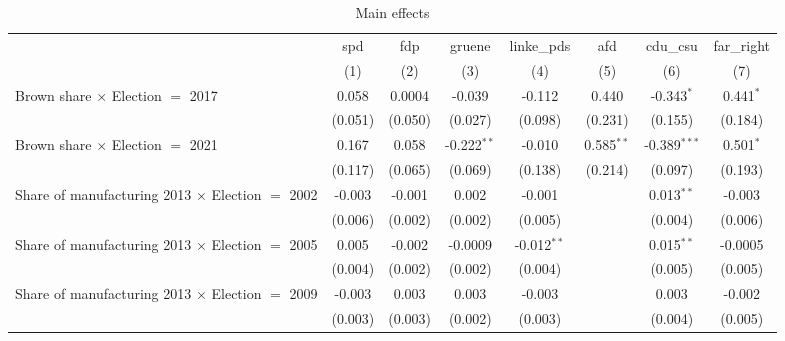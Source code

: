 \begin{table}[htbp]
   \caption{Main effects}
   \centering
   \begin{tabular}{lccccccc}
      \tabularnewline \midrule \midrule
                                                              & spd           & fdp          & gruene         & linke\_pds    & afd            & cdu\_csu       & far\_right\\   
                                                              & (1)           & (2)          & (3)            & (4)           & (5)            & (6)            & (7)\\  
      Brown share $\times$ Election $=$ 2017                  & 0.058         & 0.0004       & -0.039         & -0.112        & 0.440          & -0.343$^{*}$   & 0.441$^{*}$\\   
                                                              & (0.051)       & (0.050)      & (0.027)        & (0.098)       & (0.231)        & (0.155)        & (0.184)\\   
      Brown share $\times$ Election $=$ 2021                  & 0.167         & 0.058        & -0.222$^{**}$  & -0.010        & 0.585$^{**}$   & -0.389$^{***}$ & 0.501$^{*}$\\   
                                                              & (0.117)       & (0.065)      & (0.069)        & (0.138)       & (0.214)        & (0.097)        & (0.193)\\   
      Share of manufacturing 2013 $\times$ Election $=$ 2002  & -0.003        & -0.001       & 0.002          & -0.001        &                & 0.013$^{**}$   & -0.003\\   
                                                              & (0.006)       & (0.002)      & (0.002)        & (0.005)       &                & (0.004)        & (0.006)\\   
      Share of manufacturing 2013 $\times$ Election $=$ 2005  & 0.005         & -0.002       & -0.0009        & -0.012$^{**}$ &                & 0.015$^{**}$   & -0.0005\\   
                                                              & (0.004)       & (0.002)      & (0.002)        & (0.004)       &                & (0.005)        & (0.005)\\   
      Share of manufacturing 2013 $\times$ Election $=$ 2009  & -0.003        & 0.003        & 0.003          & -0.003        &                & 0.003          & -0.002\\   
                                                              & (0.003)       & (0.003)      & (0.002)        & (0.003)       &                & (0.004)        & (0.005)\\   

\end{tabular}
\end{table}
